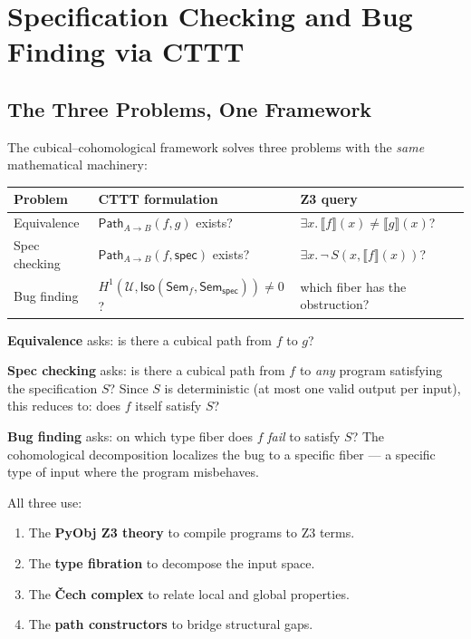\documentclass[11pt,a4paper]{report}
\theoremstyle{definition}
\theoremstyle{plain}
\newcommand{\den}[1]{\llbracket #1 \rrbracket}
\newcommand{\Path}{\mathsf{Path}}
\newcommand{\covers}{\mathcal{U}}
\newcommand{\Sem}{\mathsf{Sem}}
\newcommand{\Iso}{\mathsf{Iso}}
\newcommand{\Hone}{H^1}
\begin{document}
\part{Specification Checking and Bug Finding via CTTT}

\chapter{The Three Problems, One Framework}
\label{ch:three-problems}

The cubical--cohomological framework solves three problems with the
\emph{same} mathematical machinery:

\begin{center}
\begin{tabular}{l l l}
  \textbf{Problem} & \textbf{CTTT formulation} & \textbf{Z3 query} \\
  \hline
  Equivalence & $\Path_{A \to B}(f, g)$ exists? &
    $\exists x.\, \den{f}(x) \neq \den{g}(x)$? \\
  Spec checking & $\Path_{A \to B}(f, \mathsf{spec})$ exists? &
    $\exists x.\, \lnot\,S(x, \den{f}(x))$? \\
  Bug finding & $\Hone(\covers, \Iso(\Sem_f, \Sem_\mathsf{spec})) \neq 0$? &
    which fiber has the obstruction? \\
\end{tabular}
\end{center}

\textbf{Equivalence} asks: is there a cubical path from $f$ to $g$?

\textbf{Spec checking} asks: is there a cubical path from $f$ to
\emph{any} program satisfying the specification $S$?  Since $S$ is
deterministic (at most one valid output per input), this reduces to:
does $f$ itself satisfy $S$?

\textbf{Bug finding} asks: on which type fiber does $f$ \emph{fail}
to satisfy $S$?  The cohomological decomposition localizes the bug
to a specific fiber --- a specific type of input where the program
misbehaves.

All three use:
\begin{enumerate}
  \item The \textbf{PyObj Z3 theory} to compile programs to Z3 terms.
  \item The \textbf{type fibration} to decompose the input space.
  \item The \textbf{\v{C}ech complex} to relate local and global
    properties.
  \item The \textbf{path constructors} to bridge structural gaps.
\end{enumerate}
\end{document}
